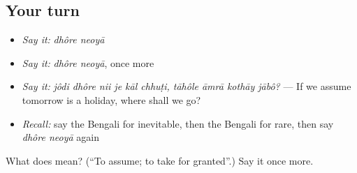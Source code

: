 \subsection*{Your turn}
\begin{itemize}
\raggedright
  \item \emph{Say it:} \emph{dhôre neoyā}
  \item \emph{Say it:} \emph{dhôre neoyā}, once more
  \item \emph{Say it:} \emph{jôdi dhôre nii je kāl chhuṭi, tāhôle āmrā kothāy jābô?} — If we assume tomorrow is a holiday, where shall we go?
  \item \emph{Recall:} say the Bengali for inevitable, then the Bengali for rare, then say \emph{dhôre neoyā} again
\end{itemize}

\begin{tcolorbox}[breakable,colback=teal!4,colframe=teal!35!black,title={Before you move on}]
What does   mean? (\textquotedblleft{}To assume; to take for granted\textquotedblright{}.) Say it once more.
\end{tcolorbox}
